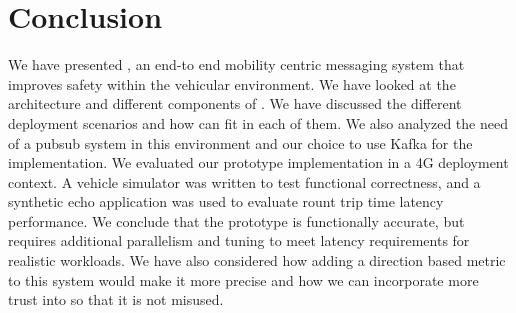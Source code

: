 \section{Conclusion}

We have presented \name, an end-to end mobility centric messaging
system that improves safety within the vehicular environment. We have
looked at the architecture and different components of \name. We
have discussed the different deployment scenarios and how \name can
fit in each of them. We also analyzed the need of a pubsub system in
this environment and our choice to use Kafka for the
implementation. We evaluated our prototype \name implementation in a
4G deployment context. A vehicle simulator was written to test
functional correctness, and a synthetic echo application was used to
evaluate rount trip time latency performance. We conclude that the
prototype is functionally accurate, but requires additional
parallelism and tuning to meet latency requirements for realistic
workloads. We have also considered how adding a direction based metric
to this system would make it more precise and how we can incorporate
more trust into \name so that it is not misused.
